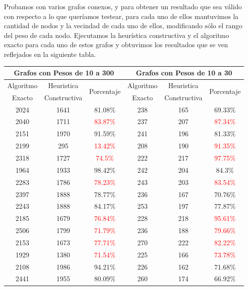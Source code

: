 \documentclass[a4paper, 10pt]{article}
\begin{document}
Probamos con varios grafos conexos, y para obtener un resultado que sea v\'alido con respecto a lo que quer\'iamos testear, para cada uno de ellos mantuvimos la cantidad de nodos y la vecindad de cada uno de ellos, modificando s\'olo el rango del peso de cada nodo. Ejecutamos la heur\'istica constructiva y el algoritmo exacto para cada uno de estos grafos y obtuvimos los resultados que se ven reflejados en la siguiente tabla. \\

\begin{center}
\begin{tabular}{|c|c|c|c|c|c|}
\hline
\multicolumn{3}{|c|}{Grafos con Pesos de 10 a 300} & \multicolumn{3}{|c|}{Grafos con Pesos de 10 a 30} \\
\hline
Algoritmo & Heuristica & \multirow{2}{*}{Porcentaje} & Algoritmo & Heuristica & \multirow{2}{*}{Porcentaje} \\
Exacto & Constructiva & & Exacto & Constructiva & \\		
\hline
2024 & 1641 & 81.08\% & 238 & 165 & 69.33\% \\
2040 & 1711 & \textcolor{red}{83.87\%} & 237 & 207 & \textcolor{red}{87.34\%} \\
2151 & 1970 & 91.59\% & 241 & 196 & 81.33\% \\
2199 & 295 & \textcolor{red}{13.42\%} & 208 & 190 & \textcolor{red}{91.35\%} \\
2318 & 1727 & \textcolor{red}{74.5\%} & 222 & 217 & \textcolor{red}{97.75\%} \\
1964 & 1933 & 98.42\% & 242 & 204 & 84.3\% \\
2283 & 1786 & \textcolor{red}{78.23\%} & 243 & 203 & \textcolor{red}{83.54\%} \\
2397 & 1888 & 78.77\% & 236 & 167 & 70.76\% \\
2243 & 1888 & 84.17\% & 253 & 197 & 77.87\% \\
2185 & 1679 & \textcolor{red}{76.84\%} & 228 & 218 & \textcolor{red}{95.61\%} \\
2506 & 1799 & \textcolor{red}{71.79\%} & 236 & 188 & \textcolor{red}{79.66\%} \\
2153 & 1673 & \textcolor{red}{77.71\%} & 270 & 222 & \textcolor{red}{82.22\%} \\
1929 & 1380 & \textcolor{red}{71.54\%} & 225 & 166 & \textcolor{red}{73.78\%} \\
2108 & 1986 & 94.21\% & 226 & 162 & 71.68\% \\
2441 & 1955 & 80.09\% & 260 & 174 & 66.92\% \\

\end{tabular}
\end{center}
\end{document}
